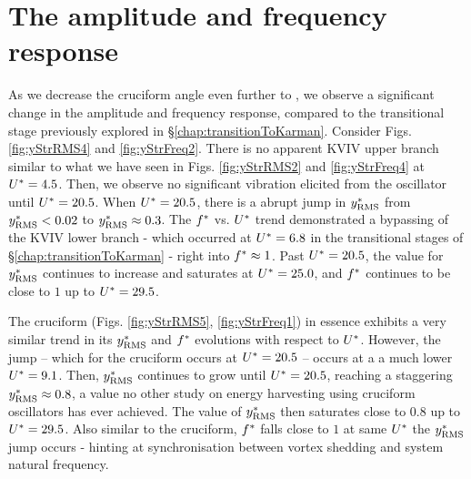 \documentclass[oneside]{utmthesis}
\begin{document}
\section{The amplitude and frequency response}\label{sec:kvivAmpFreqResp}
As we decrease the cruciform angle even further to \angtw{}, we observe a significant change in the amplitude and frequency response, compared to the transitional stage previously explored in \S\ref{chap:transitionToKarman}. Consider Figs. \ref{fig:yStrRMS4} and \ref{fig:yStrFreq2}. There is no apparent KVIV upper branch similar to what we have seen in Figs. \ref{fig:yStrRMS2} and \ref{fig:yStrFreq4} at $U^{*} = 4.5$. Then, we observe no significant vibration elicited from the oscillator until $U^{*} = 20.5$. When $U^{*} = 20.5$, there is a abrupt jump in $y^{*}_{\text{RMS}}$ from $y^{*}_{\text{RMS}} < 0.02$ to $y^{*}_{\text{RMS}} \approx 0.3$. The $f^{*}$ vs. $U^{*}$ trend demonstrated a bypassing of the KVIV lower branch - which occurred at $U^{*} = 6.8$ in the transitional stages of \S\ref{chap:transitionToKarman} - right into $f^{*} \approx 1$. Past $U^{*} = 20.5$, the value for $y^{*}_{\text{RMS}}$ continues to increase and saturates at $U^{*} = 25.0$, and $f^{*}$ continues to be close to $1$ up to $U^{*} = 29.5$.

The \angon{} cruciform (Figs. \ref{fig:yStrRMS5}, \ref{fig:yStrFreq1}) in essence exhibits a very similar trend in its $y^{*}_{\text{RMS}}$ and $f^{*}$ evolutions with respect to $U^{*}$. However, the jump -- which for the \angtw{} cruciform occurs at $U^{*} = 20.5$ -- occurs at a a much lower $U^{*} = 9.1$. Then, $y^{*}_{\text{RMS}}$ continues to grow until $U^{*} = 20.5$, reaching a staggering $y^{*}_{\text{RMS}} \approx 0.8$, a value no other study on energy harvesting using cruciform oscillators has ever achieved. The value of $y^{*}_{\text{RMS}}$ then saturates close to $0.8$ up to $U^{*} = 29.5$. Also similar to the \angtw{} cruciform, $f^{*}$ falls close to $1$ at same $U^{*}$ the $y^{*}_{\text{RMS}}$ jump occurs - hinting at synchronisation between vortex shedding and system natural frequency.
\end{document}
